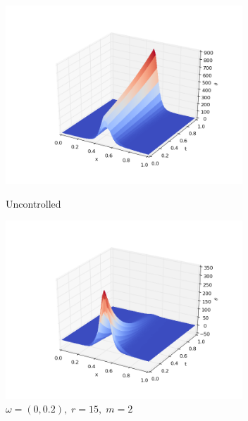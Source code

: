\documentclass[a4:paper,14pt]{article}
\begin{document}
\begin{figure}[h]
\centering
\begin{minipage}{.5\textwidth}
  \centering
  \includegraphics[width=3.5in]{ex_x2_s15}
  \caption{Uncontrolled}
  \label{fig:test1}
\end{minipage}%
\begin{minipage}{.5\textwidth}
  \centering
  \includegraphics[width=3.5in]{re_x2_s15}
  \caption{$\omega = (0, 0.2), \; r = 15, \; m = 2$}
  \label{fig:test2}
\end{minipage}
\end{figure}
\end{document}
